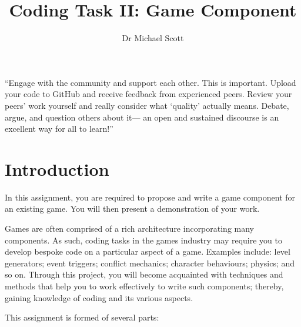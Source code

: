 \documentclass{../fal_assignment}
\title{Coding Task II: Game Component}
\author{Dr Michael Scott}
\begin{document}
\maketitle
\begin{marginquote}
    ``Engage with the community and support each other. This is important.
    Upload your code to GitHub and receive feedback from experienced peers.
    Review your peers' work yourself and really consider what `quality' actually means.
    Debate, argue, and question others about it---
    an open and sustained discourse is an excellent way for all to learn!''
\end{marginquote}
\section*{Introduction}

In this assignment, you are required to propose and write a game component for an existing game. You will then present a demonstration of your work.

Games are often comprised of a rich architecture incorporating many components. As such, coding tasks in the games industry may require you to develop bespoke code on a particular aspect of a game. Examples include: level generators; event triggers; conflict mechanics; character behaviours; physics; and so on. Through this project, you will become acquainted with techniques and methods that help you to work effectively to write such components; thereby, gaining knowledge of coding and its various aspects.

This assignment is formed of several parts:
\end{document}
